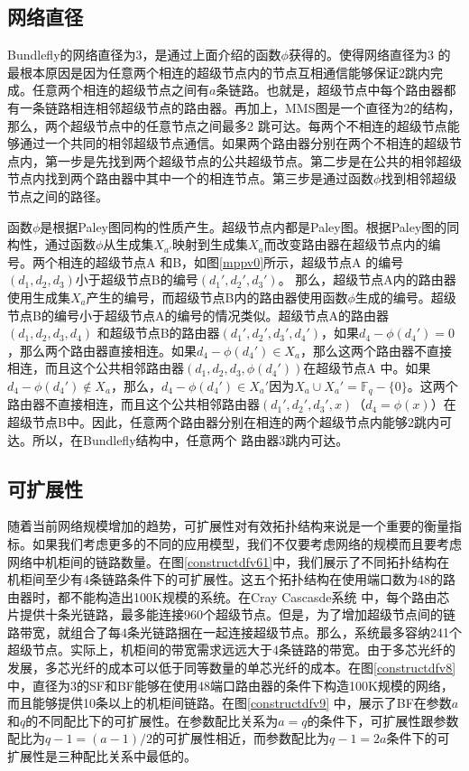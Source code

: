\subsection{网络直径}

Bundlefly的网络直径为3，是通过上面介绍的函数$\phi$获得的。使得网络直径为3 的最根本原因是因为任意两个相连的超级节点内的节点互相通信能够保证2跳内完成。任意两个相连的超级节点之间有$a$条链路。也就是，超级节点中每个路由器都有一条链路相连相邻超级节点的路由器。再加上，MMS图是一个直径为2的结构，那么，两个超级节点中的任意节点之间最多2 跳可达。每两个不相连的超级节点能够通过一个共同的相邻超级节点通信。如果两个路由器分别在两个不相连的超级节点内，第一步是先找到两个超级节点的公共超级节点。第二步是在公共的相邻超级节点内找到两个路由器中其中一个的相连节点。第三步是通过函数$\phi$找到相邻超级节点之间的路径。

函数$\phi$是根据Paley图同构的性质产生。超级节点内都是Paley图。根据Paley图的同构性，通过函数$\phi$从生成集$X_{a'}$映射到生成集$X_{a}$而改变路由器在超级节点内的编号。两个相连的超级节点A 和B，如图\ref{mppv0}所示，超级节点A 的编号$(d_{1},d_{2},d_{3})$小于超级节点B的编号$(d_{1}',d_{2}',d_{3}')$。 那么，超级节点A内的路由器使用生成集$X_{a}$产生的编号，而超级节点B内的路由器使用函数$\phi$生成的编号。超级节点B的编号小于超级节点A的编号的情况类似。超级节点A的路由器$(d_{1},d_{2},d_{3},d_{4})$ 和超级节点B的路由器$(d_{1}',d_{2}',d_{3}',d_{4}')$，如果$d_{4}-\phi(d_{4}')=0$，那么两个路由器直接相连。如果$d_{4}-\phi(d_{4}')\in X_{a}$，那么这两个路由器不直接相连，而且这个公共相邻路由器$(d_{1},d_{2},d_{3},\phi(d_{4}'))$在超级节点A 中。如果$d_{4}-\phi(d_{4}') \notin X_{a}$，那么，$d_{4}-\phi(d_{4}')\in X_{a}'$因为$X_{a} \cup X_{a}'=\mathds{F}_q-\{0\}$。这两个路由器不直接相连，而且这个公共相邻路由器$(d_{1}',d_{2}',d_{3}',x)$（$d_{4}=\phi(x)$）在超级节点B中。因此，任意两个路由器分别在相连的两个超级节点内能够2跳内可达。所以，在Bundlefly结构中，任意两个
路由器3跳内可达。

\subsection{可扩展性}

随着当前网络规模增加的趋势，可扩展性对有效拓扑结构来说是一个重要的衡量指标。如果我们考虑更多的不同的应用模型，我们不仅要考虑网络的规模而且要考虑网络中机柜间的链路数量。在图\ref{constructdfv61}中，我们展示了不同拓扑结构在机柜间至少有4条链路条件下的可扩展性。这五个拓扑结构在使用端口数为48的路由器时，都不能构造出100K规模的系统。在Cray Cascasde系统 中，每个路由芯片提供十条光链路，最多能连接960个超级节点。但是，为了增加超级节点间的链路带宽，就组合了每4条光链路捆在一起连接超级节点。那么，系统最多容纳241个超级节点。实际上，机柜间的带宽需求远远大于4条链路的带宽。由于多芯光纤的发展，多芯光纤的成本可以低于同等数量的单芯光纤的成本。在图\ref{constructdfv8}中，直径为3的SF和BF能够在使用48端口路由器的条件下构造100K规模的网络，而且能够提供10条以上的机柜间链路。在图\ref{constructdfv9} 中，展示了BF在参数$a$和$q$的不同配比下的可扩展性。在参数配比关系为$a=q$的条件下，可扩展性跟参数配比为$q-1=(a-1)/2$的可扩展性相近，而参数配比为$q-1=2a$条件下的可扩展性是三种配比关系中最低的。

